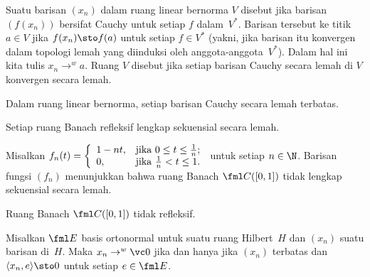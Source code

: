 \begin{defn} Suatu barisan $(x_n)$ dalam ruang linear bernorma $V$ disebut
 jika barisan $(f(x_n))$ bersifat Cauchy untuk setiap $f$ dalam~$V^*$. Barisan
tersebut
 ke titik $a \in V$ jika $f(x_n) \sto f(a)$ untuk setiap $f \in V^*$
(yakni, jika barisan itu konvergen dalam topologi lemah yang diinduksi oleh anggota-anggota~$V^*$). Dalam hal ini
kita tulis
$x_n \to^w a$. Ruang $V$ disebut
 jika setiap barisan Cauchy secara lemah di $V$ konvergen secara lemah.
\end{defn}

\begin{prop} Dalam ruang linear bernorma, setiap barisan Cauchy secara lemah terbatas.
\end{prop}

\begin{prop} Setiap ruang Banach refleksif lengkap sekuensial secara lemah.
\end{prop}

\begin{exam} Misalkan $f_n(t) = \left\{
                             \begin{array}{ll}
                               1 - nt, & \hbox{jika $0 \le t \le \frac1n$;} \\
                               0, & \hbox{jika $\frac1n < t \le 1$.}
                             \end{array}
                           \right.$ untuk setiap $n \in \N$. Barisan fungsi $(f_n)$ menunjukkan bahwa ruang Banach
$\fml C([0,1])$ tidak lengkap sekuensial secara lemah.
\end{exam}

\begin{cor} Ruang Banach $\fml C([0,1])$ tidak refleksif.
\end{cor}

\begin{prop} Misalkan $\fml E$ basis ortonormal untuk suatu ruang Hilbert~$H$ dan $(x_n)$ suatu
barisan di~$H$. Maka $x_n \to^w \vc 0$ jika dan hanya jika $(x_n)$ terbatas dan $\langle
x_n,e \rangle \sto 0$ untuk setiap $e \in \fml E$.
\end{prop}

